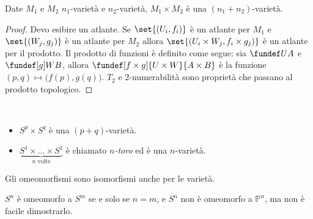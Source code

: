
\begin{prop}
	Date $M_{1}$ e $M_2$ $n_1$-varietà e $n_2$-varietà,
	$M_1\times M_2$ è una $(n_1+n_2)$-varietà.
\end{prop}

\begin{proof}
	Devo esibire un atlante.
	Se $\set{(U_i, f_i)}$ è un atlante per $M_1$ e $\set{(W_j, g_j)}$ è un atlante per $M_2$ 
	allora $\set{(U_i \times W_j, f_i \times g_j)}$ è un atlante per il prodotto.
	Il prodotto di funzioni è definito come segue: sia $\fundef UA$ e $\fundef[g]WB$,
	allora $\fundef[f\times g]{U\times W}{A\times B}$ è la funzione $(p, q) \mapsto \big(f(p), g(q)\big)$.
	$T_2$ e 2-numerabilità sono proprietà che passano al prodotto topologico.
\end{proof}


\begin{es}~
	\begin{itemize}
		\item $S^p \times S^q$ è una $(p+q)$-varietà.
		\item
			$\underbrace{S^1 \times \dots \times S^1}_\text{$n$ volte}$
			è chiamato \emph{$n$-toro} ed è una $n$-varietà.
	\end{itemize}
\end{es}



\begin{oss}
	Gli omeomorfismi sono isomorfismi anche per le varietà.
\end{oss}

\begin{fat} 
	$S^n$ è omeomorfo a $S^m$ se e solo se $n=m$,
	e $S^n$ non è omeomorfo a $\mathbb{P}^n$,
	ma non è facile dimostrarlo.
\end{fat}

